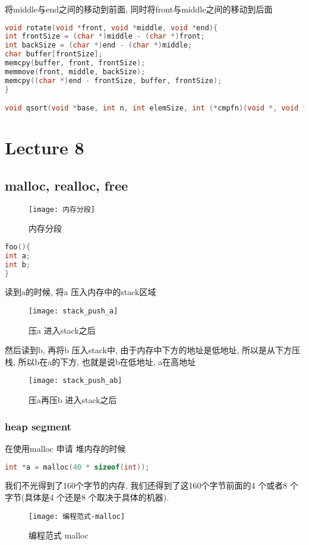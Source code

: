 \documentclass{article}
\begin{document}
将middle与end之间的移动到前面, 同时将front与middle之间的移动到后面
\begin{lstlisting}[language = C]
void rotate(void *front, void *middle, void *end){
int frontSize = (char *)middle - (char *)front;
int backSize = (char *)end - (char *)middle;
char buffer[frontSize];
memcpy(buffer, front, frontSize);
memmove(front, middle, backSize);
memcpy((char *)end - frontSize, buffer, frontSize);
}

void qsort(void *base, int n, int elemSize, int (*cmpfn)(void *, void *))
\end{lstlisting}

\section{Lecture 8}
\subsection{malloc, realloc, free}
\begin{figure}[htbp]
	\centering
	\texttt{[image: 内存分段]}\\
	\caption{内存分段}\label{fig.内存分段}
\end{figure}

\begin{lstlisting}[language = C]
foo(){
int a;
int b;
}
\end{lstlisting}
读到a的时候, 将a 压入内存中的stack区域
\begin{figure}[htbp]
	\centering
	\texttt{[image: stack\_push\_a]}\\
	\caption{压a 进入stack之后}\label{fig.stack.push.a}
\end{figure}
然后读到b, 再将b 压入stack中, 由于内存中下方的地址是低地址, 所以是从下方压栈, 所以b在a的下方, 也就是说b在低地址, a在高地址
\begin{figure}[htbp]
	\centering
	\texttt{[image: stack\_push\_ab]}\\
	\caption{压a再压b 进入stack之后}\label{fig.stack.push.ab}
\end{figure}
 \bigskip
\subsubsection{heap segment}
在使用malloc 申请 堆内存的时候
\begin{lstlisting}[language = C]
int *a = malloc(40 * sizeof(int));
\end{lstlisting}
我们不光得到了160个字节的内存,  我们还得到了这160个字节前面的4 个或者8 个字节(具体是4 个还是8 个取决于具体的机器).
\begin{figure}[htbp]
	\centering
	\texttt{[image: 编程范式-malloc]}\\
	\caption{编程范式 malloc}\label{fig.编程范式.malloc}
\end{figure}
\end{document}
